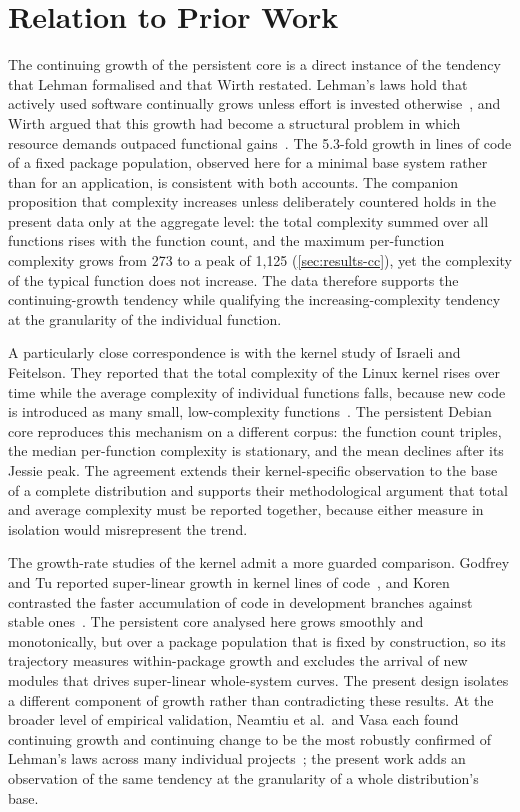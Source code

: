 \section{Relation to Prior Work}
\label{sec:relation-prior-work}

The continuing growth of the persistent core is a direct instance of the tendency that Lehman formalised and that Wirth restated. Lehman's laws hold that actively used software continually grows unless effort is invested otherwise~\cite{Lehman1980Laws}, and Wirth argued that this growth had become a structural problem in which resource demands outpaced functional gains~\cite{Wirth1995Plea}. The 5.3-fold growth in lines of code of a fixed package population, observed here for a minimal base system rather than for an application, is consistent with both accounts. The companion proposition that complexity increases unless deliberately countered holds in the present data only at the aggregate level: the total complexity summed over all functions rises with the function count, and the maximum per-function complexity grows from 273 to a peak of 1{,}125 (\autoref{sec:results-cc}), yet the complexity of the typical function does not increase. The data therefore supports the continuing-growth tendency while qualifying the increasing-complexity tendency at the granularity of the individual function.

A particularly close correspondence is with the kernel study of Israeli and Feitelson. They reported that the total complexity of the Linux kernel rises over time while the average complexity of individual functions falls, because new code is introduced as many small, low-complexity functions~\cite{israeli2010linux}. The persistent Debian core reproduces this mechanism on a different corpus: the function count triples, the median per-function complexity is stationary, and the mean declines after its Jessie peak. The agreement extends their kernel-specific observation to the base of a complete distribution and supports their methodological argument that total and average complexity must be reported together, because either measure in isolation would misrepresent the trend.

The growth-rate studies of the kernel admit a more guarded comparison. Godfrey and Tu reported super-linear growth in kernel lines of code~\cite{godfrey2000linux}, and Koren contrasted the faster accumulation of code in development branches against stable ones~\cite{koren2006linux}. The persistent core analysed here grows smoothly and monotonically, but over a package population that is fixed by construction, so its trajectory measures within-package growth and excludes the arrival of new modules that drives super-linear whole-system curves. The present design isolates a different component of growth rather than contradicting these results. At the broader level of empirical validation, Neamtiu et al.\ and Vasa each found continuing growth and continuing change to be the most robustly confirmed of Lehman's laws across many individual projects~\cite{neamtiu2009towards,vasa2010growth}; the present work adds an observation of the same tendency at the granularity of a whole distribution's base.

